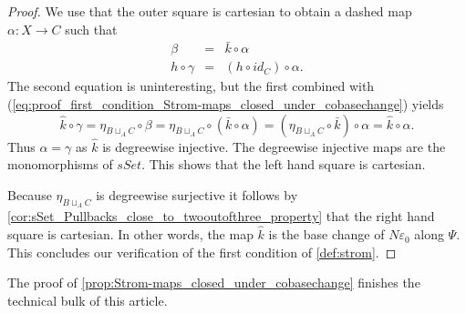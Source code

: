 \begin{proof}
We use that the outer square is cartesian to obtain a dashed map $\alpha :X\to C$ such that
\begin{displaymath}
\begin{array}{rcl}
\beta & = & \bar{k} \circ \alpha \\
h\circ \gamma & = & (h\circ id_C)\circ \alpha .
\end{array}
\end{displaymath}
The second equation is uninteresting, but the first combined with (\ref{eq:proof_first_condition_Strom-maps_closed_under_cobasechange}) yields
\[\hat{k} \circ \gamma =\eta _{B\sqcup _AC}\circ \beta =\eta _{B\sqcup _AC}\circ (\bar{k} \circ \alpha )=(\eta _{B\sqcup _AC}\circ \bar{k} )\circ \alpha =\hat{k} \circ \alpha .\]
Thus $\alpha =\gamma$ as $\hat{k}$ is degreewise injective. The degreewise injective maps are the monomorphisms of $sSet$. This shows that the left hand square is cartesian.

Because $\eta _{B\sqcup _AC}$ is degreewise surjective it follows by \cref{cor:sSet_Pullbacks_close_to_twooutofthree_property} that the right hand square is cartesian. In other words, the map $\hat{k}$ is the base change of $N\varepsilon _0$ along $\Psi$. This concludes our verification of the first condition of \cref{def:strom}.
\end{proof}
\noindent The proof of \cref{prop:Strom-maps_closed_under_cobasechange} finishes the technical bulk of this article.

